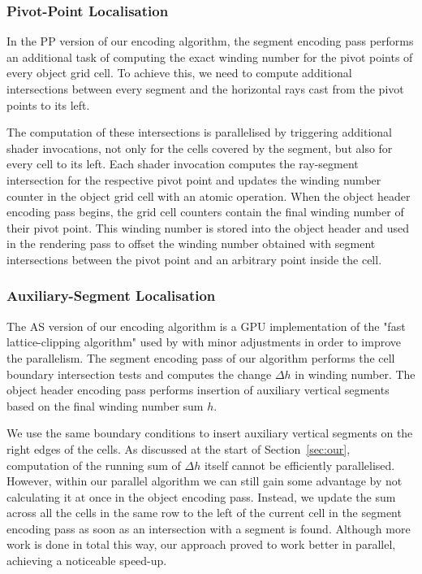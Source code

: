 \documentclass[11pt,a4paper,twoside]{article}
\begin{document}
\subsubsection {Pivot-Point Localisation}

In the PP version of our encoding algorithm, the segment encoding pass performs an additional task of computing the exact winding number for the pivot points of every object grid cell. To achieve this, we need to compute additional intersections between every segment and the horizontal rays cast from the pivot points to its left.

The computation of these intersections is parallelised by triggering additional shader invocations, not only for the cells covered by the segment, but also for every cell to its left. Each shader invocation computes the ray-segment intersection for the respective pivot point and updates the winding number counter in the object grid cell with an atomic operation. When the object header encoding pass begins, the grid cell counters contain the final winding number of their pivot point. This winding number is stored into the object header and used in the rendering pass to offset the winding number obtained with segment intersections between the pivot point and an arbitrary point inside the cell.

\subsubsection{Auxiliary-Segment Localisation}

The AS version of our encoding algorithm is a GPU implementation of the "fast lattice-clipping algorithm" used by \cite{NehabHoppe08} with minor adjustments in order to improve the parallelism. The segment encoding pass of our algorithm performs the cell boundary intersection tests and computes the change  $\Delta{h}$ in winding number. The object header encoding pass performs insertion of auxiliary vertical segments based on the final winding number sum $h$.

We use the same boundary conditions to insert auxiliary vertical segments on the right edges of the cells. As discussed at the start of Section~\ref{sec:our}, computation of the running sum of $\Delta{h}$ itself cannot be efficiently parallelised. However, within our parallel algorithm we can still gain some advantage by not calculating it at once in the object encoding pass. Instead, we update the sum across all the cells in the same row to the left of the current cell in the segment encoding pass as soon as an intersection with a segment is found. Although more work is done in total this way, our approach proved to work better in parallel, achieving a noticeable speed-up.
\end{document}
